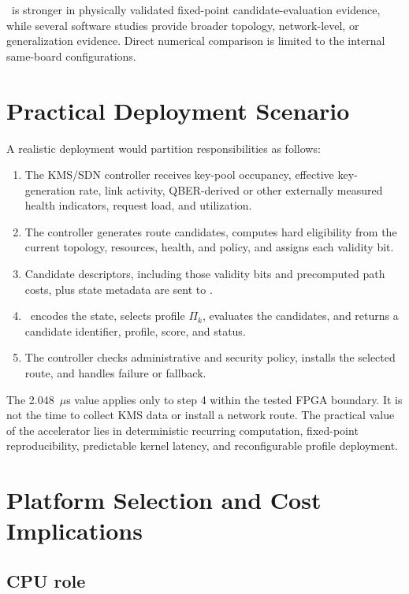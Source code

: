 \QFlow\ is stronger in physically validated fixed-point candidate-evaluation
evidence, while several software studies provide broader topology, network-level,
or generalization evidence. Direct numerical comparison is limited to the internal
same-board configurations.

\section{Practical Deployment Scenario}

A realistic deployment would partition responsibilities as follows:

\begin{enumerate}
  \item The KMS/SDN controller receives key-pool occupancy, effective key-generation
  rate, link activity, QBER-derived or other externally measured health indicators,
  request load, and utilization.
  \item The controller generates route candidates, computes hard eligibility from
  the current topology, resources, health, and policy, and assigns each validity bit.
  \item Candidate descriptors, including those validity bits and precomputed path
  costs, plus state metadata are sent to \QFlow.
  \item \QFlow\ encodes the state, selects profile $\Pi_k$, evaluates the candidates,
  and returns a candidate identifier, profile, score, and status.
  \item The controller checks administrative and security policy, installs the
  selected route, and handles failure or fallback.
\end{enumerate}

The 2.048~$\mu$s value applies only to step 4 within the tested FPGA boundary. It is
not the time to collect KMS data or install a network route. The practical value of
the accelerator lies in deterministic recurring computation, fixed-point
reproducibility, predictable kernel latency, and reconfigurable profile deployment.

\section{Platform Selection and Cost Implications}

\subsection{CPU role}

